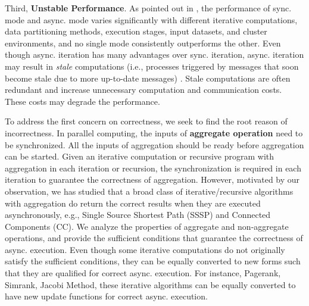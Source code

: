 Third, \textbf{Unstable Performance}. As pointed out in \cite{Xie2015SYNC}, the performance of sync. mode and async. mode varies significantly with different iterative computations, data partitioning methods, execution stages, input datasets, and cluster environments, and no single mode consistently outperforms the other. Even though async. iteration has many advantages over sync. iteration, async. iteration may result in \emph{stale} computations (i.e., processes triggered by messages that soon become stale due to more up-to-date messages) \cite{Fan2018Adaptive}. Stale computations are often redundant and increase unnecessary computation and communication costs. These costs may degrade the performance.




To address the first concern on correctness, we seek to find the root reason of incorrectness. In parallel computing, the inputs of \textbf{aggregate operation} need to be synchronized. All the inputs of aggregation should be ready before aggregation can be started. Given an iterative computation or recursive program with aggregation in each iteration or recursion, the synchronization is required in each iteration to guarantee the correctness of aggregation. However, motivated by our observation, we has studied that a broad class of iterative/recursive algorithms with aggregation do return the correct results when they are executed asynchronously, e.g., Single Source Shortest Path (SSSP) and Connected Components (CC). We analyze the properties of aggregate and non-aggregate operations, and provide the sufficient conditions that guarantee the correctness of async. execution. Even though some iterative computations do not originally satisfy the sufficient conditions, they can be equally converted to new forms such that they are qualified for correct async. execution. For instance, Pagerank, Simrank, Jacobi Method, these iterative algorithms can be equally converted to have new update functions for correct async. execution.


